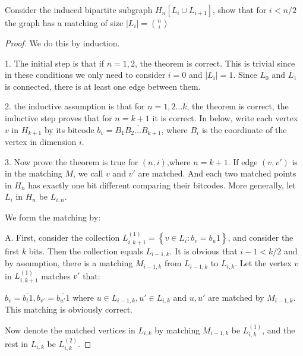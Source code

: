 


    \maketitle

    \begin{thm}{}{}
        Consider the induced bipartite subgraph $H_n[L_i\cup L_{i+1}]$, show that for $i<n/2$ the graph has a matching of size $|L_i|=\binom{n}{i}$
    \end{thm}
    \begin{proof}
        We do this by induction. 
        
        1. The initial step is that if $n=1,2$, the theorem is correct. 
        This is trivial since in these conditions we only need to consider $i=0$ and $|L_i|=1$. 
        Since $L_0$ and $L_1$ is connected, there is at least one edge between them. 

        2. the inductive assumption is that for $n=1,2\dots k$, the theorem is correct, 
        the inductive step proves that for $n=k+1$ it is correct. 
        In below, write each vertex $v$ in $H_{k+1}$ by its bitcode $b_v=\overline{B_1B_2\dots B_{k+1}}$, 
        where $B_i$ is the coordinate of the vertex in dimension $i$. 

        3. Now prove the theorem is true for $(n, i)$,where $n=k+1$. 
        If edge $(v,v')$ is in the matching $M$, we call $v$ and $v'$ are matched. 
        And each two matched points in $H_n$ has exactly one bit different comparing their bitcodes. 
        More generally, let $L_i$ in $H_n$ be $L_{i,n}$. 

        We form the matching by: 

        A. First, consider the collection $L_{i, k+1}^{(1)}=\left\{v\in L_{i}:b_v=\overline{b_u1}\right\}$, 
        and consider the first $k$ bits. Then the collection equals $L_{i-1, k}$. 
        It is obvious that $i-1<k/2$ and by assumption, there is a matching $M_{i-1,k}$ 
        from $L_{i-1,k}$ to $L_{i,k}$. Let the vertex $v$ in $L_{i,k+1}^{(1)}$ matches $v'$ that: 
        
        $b_v=\overline{b_t1},b_{v'}=\overline{b_{u'}1}$ where $u\in L_{i-1,k},u'\in L_{i,k}$ 
        and $u,u'$ are matched by $M_{i-1,k}$. This matching is obviously correct. 
        
        Now denote the matched vertices in $L_{i,k}$ by matching $M_{i-1,k}$ be $L_{i,k}^{(1)}$, 
        and the rest in $L_{i,k}$ be $L_{i,k}^{(2)}$. 


\end{proof}
